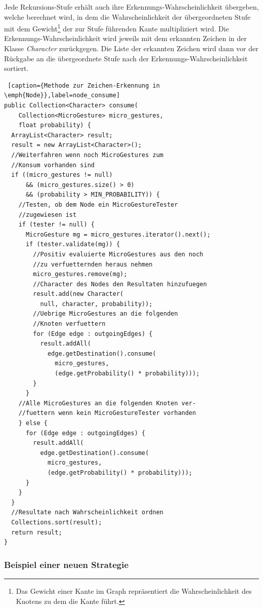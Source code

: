 Jede Rekursions-Stufe erhält auch ihre Erkennungs-Wahrscheinlichkeit übergeben, welche berechnet wird, in dem die Wahrscheinlichkeit der übergeordneten Stufe mit dem Gewicht\footnote{Das Gewicht einer Kante im Graph repräsentiert die Wahrscheinlichkeit des Knotens zu dem die Kante führt.} der zur Stufe führenden Kante multipliziert wird. Die Erkennungs-Wahrscheinlichkeit wird jeweils mit dem erkannten Zeichen in der Klasse \emph{Character} zurückgegen. Die Liste der erkannten Zeichen wird dann vor der Rückgabe an die übergeordnete Stufe nach der Erkennungs-Wahrscheinlichkeit sortiert.

\begin{lstlisting} [caption={Methode zur Zeichen-Erkennung in \emph{Node}},label=node_consume]
public Collection<Character> consume(
    Collection<MicroGesture> micro_gestures, 
    float probability) {
  ArrayList<Character> result;
  result = new ArrayList<Character>();
  //Weiterfahren wenn noch MicroGestures zum 
  //Konsum vorhanden sind
  if ((micro_gestures != null) 
      && (micro_gestures.size() > 0) 
      && (probability > MIN_PROBABILITY)) {
    //Testen, ob dem Node ein MicroGestureTester 
    //zugewiesen ist
    if (tester != null) {
      MicroGesture mg = micro_gestures.iterator().next();
      if (tester.validate(mg)) {
        //Positiv evaluierte MicroGestures aus den noch 
        //zu verfuetternden heraus nehmen
        micro_gestures.remove(mg);
        //Character des Nodes den Resultaten hinzufuegen
        result.add(new Character(
          null, character, probability));
        //Uebrige MicroGestures an die folgenden 
        //Knoten verfuettern
        for (Edge edge : outgoingEdges) {
          result.addAll(
            edge.getDestination().consume(
              micro_gestures, 
              (edge.getProbability() * probability)));
        }
      }
    //Alle MicroGestures an die folgenden Knoten ver-
    //fuettern wenn kein MicroGestureTester vorhanden
    } else {
      for (Edge edge : outgoingEdges) {
        result.addAll(
          edge.getDestination().consume(
            micro_gestures, 
            (edge.getProbability() * probability)));
      }
    }
  }
  //Resultate nach Wahrscheinlichkeit ordnen
  Collections.sort(result);
  return result;
}
\end{lstlisting}


\subsubsection{Beispiel einer neuen Strategie}


